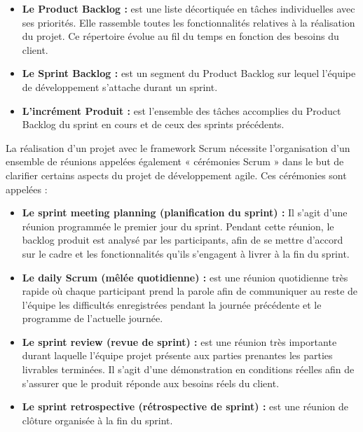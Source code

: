 \documentclass[a4paper,12pt]{report}
\begin{document}
\begin{itemize}
\item \textbf{Le Product Backlog :} est une liste décortiquée en tâches individuelles avec ses priorités. Elle rassemble toutes les fonctionnalités relatives à la réalisation du projet. Ce répertoire évolue au fil du temps en fonction des besoins du client.

\item \textbf{Le Sprint Backlog :} est un segment du Product Backlog sur lequel l'équipe de développement s'attache durant un sprint.

\item \textbf{L'incrément Produit :} est l'ensemble des tâches accomplies du Product Backlog du sprint en cours et de ceux des sprints précédents.
\end{itemize}

La réalisation d'un projet avec le framework Scrum nécessite l'organisation d'un ensemble de réunions appelées également « cérémonies Scrum » dans le but de clarifier certains aspects du projet de développement agile. Ces cérémonies sont appelées :

\begin{itemize}
\item \textbf{Le sprint meeting planning (planification du sprint) :} Il s'agit d'une réunion programmée le premier jour du sprint. Pendant cette réunion, le backlog produit est analysé par les participants, afin de se mettre d'accord sur le cadre et les fonctionnalités qu'ils s'engagent à livrer à la fin du sprint.

\item \textbf{Le daily Scrum (mêlée quotidienne) :} est une réunion quotidienne très rapide où chaque participant prend la parole afin de communiquer au reste de l'équipe les difficultés enregistrées pendant la journée précédente et le programme de l'actuelle journée.

\item \textbf{Le sprint review (revue de sprint) :} est une réunion très importante durant laquelle l'équipe projet présente aux parties prenantes les parties livrables terminées. Il s'agit d'une démonstration en conditions réelles afin de s'assurer que le produit réponde aux besoins réels du client.

\item \textbf{Le sprint retrospective (rétrospective de sprint) :} est une réunion de clôture organisée à la fin du sprint.
\end{itemize}
\end{document}
